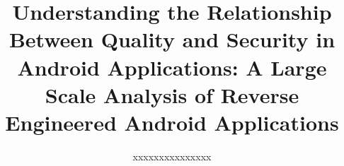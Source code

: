 \documentclass{sig-alternate}
\newif\ifisnopii
\begin{document}


\title{Understanding the Relationship Between Quality and Security in Android Applications: A Large Scale Analysis of Reverse Engineered Android Applications}



%
\ifisnopii %
\author{
%
\alignauthor
Daniel~E.~Krutz~\&~Samuel~A.~Malachowsky\\ 	
	\affaddr{Software Engineering Department}\\
       \affaddr{Rochester Institute of Technology}\\
       \affaddr{1 Lomb Memorial Drive}\\
       \affaddr{Rochester, NY, USA} \\
       \email{\{dxkvse, samvse\}@rit.edu}
       \alignauthor
} %

\else %
\author{
%
\alignauthor
xxxxxxxxxxxxxxx\\ 	
	\\
       \\
       \\
        \\
       \alignauthor
} %
\fi %
\end{document}
